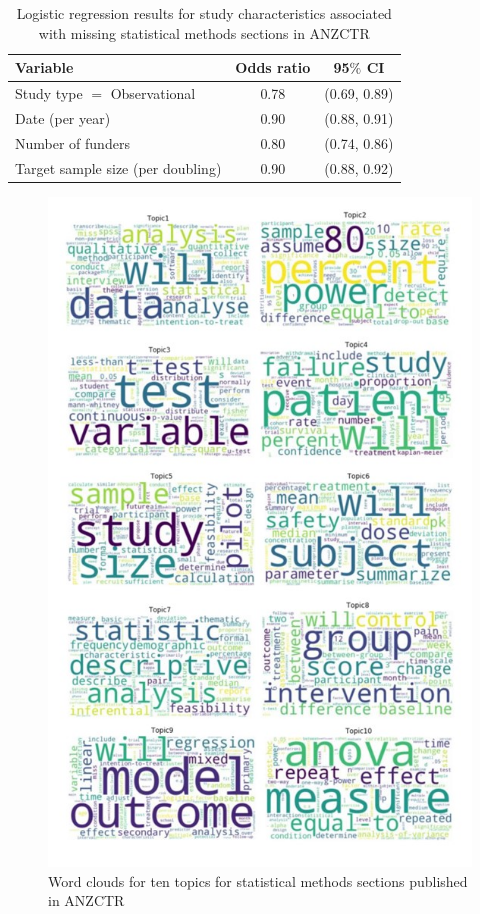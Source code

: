 \documentclass[12pt]{article}
\begin{document}
\begin{table}[]
\centering
\caption{Logistic regression results for study characteristics associated with missing statistical methods sections in ANZCTR}
\label{tab:anzctr-missing-odds}
\begin{tabular}{lcc}
\hline
Variable & Odds ratio & 95$\%$ CI \\
\hline
Study type $=$ Observational & 0.78 & (0.69, 0.89) \\
Date (per year) & 0.90 & (0.88, 0.91) \\
Number of funders & 0.80 & (0.74, 0.86) \\
Target sample size (per doubling) & 0.90 & (0.88, 0.92)\\
\hline
\end{tabular}
\end{table}

\begin{figure}

{\centering \includegraphics[width=0.7\linewidth]{figures/anzctrwordclouds} 

}

\caption{Word clouds for ten topics for statistical methods sections published in ANZCTR}\label{fig:anzctr-wordclouds}
\end{figure}
\end{document}
